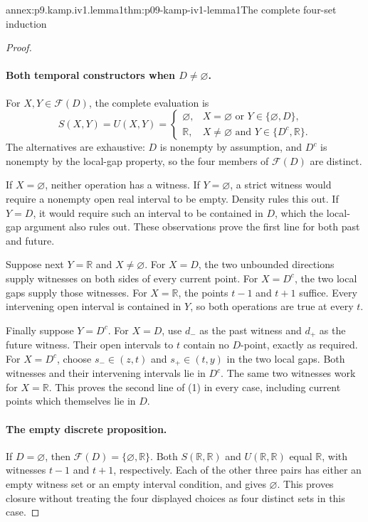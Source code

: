 \begin{annexitem}{annex:p9.kamp.iv1.lemma1}{thm:p09-kamp-iv1-lemma1}{The complete four-set induction}
\begin{proof}
\paragraph{Both temporal constructors when \(D\ne\varnothing\).}
For \(X,Y\in\mathcal F(D)\), the complete evaluation is
\[
 S(X,Y)=U(X,Y)=
 \begin{cases}
 \varnothing,&X=\varnothing\text{ or }Y\in\{\varnothing,D\},\\
 \mathbb R,&X\ne\varnothing\text{ and }Y\in\{D^c,\mathbb R\}.
 \end{cases}
 \tag{1}
\]
The alternatives are exhaustive: \(D\) is nonempty by assumption,
and \(D^c\) is nonempty by the local-gap property, so the four
members of \(\mathcal F(D)\) are distinct.

If \(X=\varnothing\), neither operation has a witness. If
\(Y=\varnothing\), a strict witness would require a nonempty
open real interval to be empty. Density rules this out. If
\(Y=D\), it would require such an interval to be contained in
\(D\), which the local-gap argument also rules out. These
observations prove the first line for both past and future.

Suppose next \(Y=\mathbb R\) and \(X\ne\varnothing\).
For \(X=D\), the two unbounded directions supply witnesses on
both sides of every current point. For \(X=D^c\), the two
local gaps supply those witnesses. For \(X=\mathbb R\),
the points \(t-1\) and \(t+1\) suffice. Every intervening
open interval is contained in \(Y\), so both operations are
true at every \(t\).

Finally suppose \(Y=D^c\). For \(X=D\), use \(d_-\)
as the past witness and \(d_+\) as the future witness. Their
open intervals to \(t\) contain no \(D\)-point, exactly as
required. For \(X=D^c\), choose
\(s_-\in(z,t)\) and \(s_+\in(t,y)\) in the two local
gaps. Both witnesses and their intervening intervals lie in
\(D^c\). The same two witnesses work for \(X=\mathbb R\).
This proves the second line of (1) in every case, including
current points which themselves lie in \(D\).

\paragraph{The empty discrete proposition.}
If \(D=\varnothing\), then
\(\mathcal F(D)=\{\varnothing,\mathbb R\}\).
Both \(S(\mathbb R,\mathbb R)\) and
\(U(\mathbb R,\mathbb R)\) equal \(\mathbb R\), with
witnesses \(t-1\) and \(t+1\), respectively. Each of the
other three pairs has either an empty witness set or an empty
interval condition, and gives \(\varnothing\). This proves
closure without treating the four displayed choices as four distinct
sets in this case.


\end{proof}
\end{annexitem}
